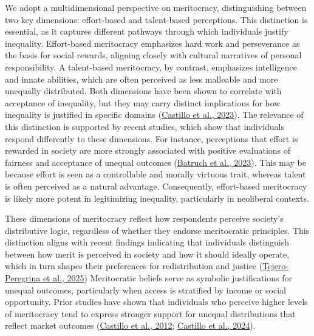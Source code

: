 \documentclass[
  12pt,
]{article}
\begin{document}
We adopt a multidimensional perspective on meritocracy, distinguishing
between two key dimensions: effort-based and talent-based perceptions.
This distinction is essential, as it captures different pathways through
which individuals justify inequality. Effort-based meritocracy
emphasizes hard work and perseverance as the basis for social rewards,
aligning closely with cultural narratives of personal responsibility. A
talent-based meritocracy, by contrast, emphasizes intelligence and
innate abilities, which are often perceived as less malleable and more
unequally distributed. Both dimensions have been shown to correlate with
acceptance of inequality, but they may carry distinct implications for
how inequality is justified in specific domains
(\protect\hyperlink{ref-castillo_multidimensional_2023}{Castillo et al.,
2023}). The relevance of this distinction is supported by recent
studies, which show that individuals respond differently to these
dimensions. For instance, perceptions that effort is rewarded in society
are more strongly associated with positive evaluations of fairness and
acceptance of unequal outcomes
(\protect\hyperlink{ref-batruch_belief_2023}{Batruch et al., 2023}).
This may be because effort is seen as a controllable and morally
virtuous trait, whereas talent is often perceived as a natural
advantage. Consequently, effort-based meritocracy is likely more potent
in legitimizing inequality, particularly in neoliberal contexts.

These dimensions of meritocracy reflect how respondents perceive
society's distributive logic, regardless of whether they endorse
meritocratic principles. This distinction aligns with recent findings
indicating that individuals distinguish between how merit is perceived
in society and how it should ideally operate, which in turn shapes their
preferences for redistribution and justice
(\protect\hyperlink{ref-tejero-peregrina_perceived_2025}{Tejero-Peregrina
et al., 2025}) Meritocratic beliefs serve as symbolic justifications for
unequal outcomes, particularly when access is stratified by income or
social opportunity. Prior studies have shown that individuals who
perceive higher levels of meritocracy tend to express stronger support
for unequal distributions that reflect market outcomes
(\protect\hyperlink{ref-castillo_percepcion_2019}{Castillo et al.,
2012}; \protect\hyperlink{ref-castillo_socialization_2024}{Castillo et
al., 2024}).
\end{document}
